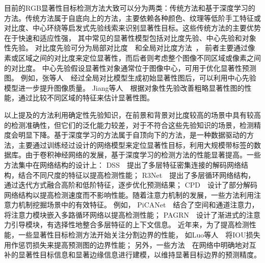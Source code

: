 
目前的RGB显著性目标检测方法大致可以分为两类：传统方法和基于深度学习的方法。传统方法属于自底向上的方法，主要依赖各种颜色、纹理等低阶手工特征或对比度、中心环绕等启发式先验线索来识别显著性目标。这些传统方法的主要优势在于快速和适应性强，
其中常见的显著性模型包括对比度先验、中心先验和对象性先验。
对比度先验可分为局部对比度~\cite{itti1998model}~和全局对比度方法~\cite{cheng2014global}，
前者主要通过像素或区域之间的对比度来定位显著性，而后者则考虑整个图像不同区域或像素之间的对比度。
中心先验假设显著性对象通常位于图像中心，可用于优化显著性预测图。
例如，张等人~\cite{zhang2015minimum}~经过全局对比模型生成初始显著性图后，可以利用中心先验模型进一步提升图像质量。
Jiang等人~\cite{jiang2013salient}~根据对象性先验改善粗略显著性图的性能，通过比较不同区域的特征来估计显著性图。


以上提及的方法利用确定性先验知识，在前景和背景对比度较高的场景中具有较高的检测准确性，但它们的泛化能力较差，对于不符合这些先验知识的场景，检测精度会明显下降。基于深度学习的方法属于自顶向下的方法，是一种数据驱动的方法，主要通过训练经过设计的网络模型来定位显著性目标，利用大规模带标签的数据库。由于卷积神经网络的发展，基于深度学习的检测方法的性能显著提高。一些方法集中在网络结构的设计上：
DSS~\cite{hou2017deeply}~提出了多层特征密集连接的解码网络结构，结合不同尺度的特征以提高检测性能；
R3Net~\cite{deng2018r3net}~提出了多层循环网络结构，通过迭代方式融合高阶和低阶特征，逐步优化预测结果；
CPD~\cite{wu2019cascaded}~设计了部分解码网络结构以提高检测速度而不影响性能。随着注意力机制的发展，一些方法利用注意力机制挖掘场景中的有效特征。
例如，
PiCANet~\cite{liu2018picanet}~结合了空间和通道注意力，将注意力模块嵌入多路循环网络以提高检测性能；
PAGRN~\cite{wang2018detect}~设计了渐进式的注意力引导模块，有选择性地整合多层特征的上下文信息。
近年来，为了提高检测性能，一些显著性目标检测方法开始关注分割边界的性能，
如Luo等人~\cite{luo2017non}~将IOU损失用作惩罚损失来提高预测图的边界性能；
另外，一些方法~\cite{zhuge2018boundary}~在网络中明确地对互补的显著性目标信息和显著边缘信息进行建模，以维持显著目标边界的预测精度。








